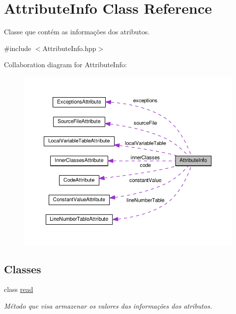 \hypertarget{classAttributeInfo}{}\section{Attribute\+Info Class Reference}
\label{classAttributeInfo}


Classe que contém as informações dos atributos.  




{\ttfamily \#include $<$Attribute\+Info.\+hpp$>$}



Collaboration diagram for Attribute\+Info\+:
\nopagebreak
\begin{figure}[H]
\begin{center}
\leavevmode
\includegraphics[width=350pt]{classAttributeInfo__coll__graph}
\end{center}
\end{figure}
\subsection*{Classes}
\begin{DoxyCompactItemize}
\item 
class \hyperlink{classAttributeInfo_1_1read}{read}
\begin{DoxyCompactList}\small\item\em Método que visa armazenar os valores das informações dos atributos. \end{DoxyCompactList}\end{DoxyCompactItemize}
